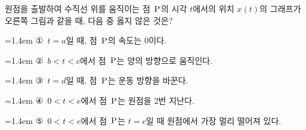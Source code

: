 \noindent\begin{minipage}[t]{0.58\linewidth}\vspace{0pt}\raggedright 원점을 출발하여 수직선 위를 움직이는 점~$\mathrm{P}$의 시각 $t$에서의 위치 $x(t)$의 그래프가 오른쪽 그림과 같을 때, 다음 중 옳지 않은 것은?\end{minipage}\hfill\begin{minipage}[t]{0.4\linewidth}\vspace{0pt}\centering \resizebox{\ifdim\width>\linewidth\linewidth\else\width\fi}{!}{}\end{minipage}\par
\par\medskip\par\noindent\hangindent=1.4em {\small ①}\ $t=a$일 때, 점~$\mathrm{P}$의 속도는 $0$이다.\par\noindent\hangindent=1.4em {\small ②}\ $b<t<c$에서 점~$\mathrm{P}$는 양의 방향으로 움직인다.\par\noindent\hangindent=1.4em {\small ③}\ $t=d$일 때, 점~$\mathrm{P}$는 운동 방향을 바꾼다.\par\noindent\hangindent=1.4em {\small ④}\ $0<t<e$에서 점~$\mathrm{P}$는 원점을 2번 지난다.\par\noindent\hangindent=1.4em {\small ⑤}\ $0<t<e$에서 점~$\mathrm{P}$는 $t=c$일 때 원점에서 가장 멀리 떨어져 있다.\par\medskip

